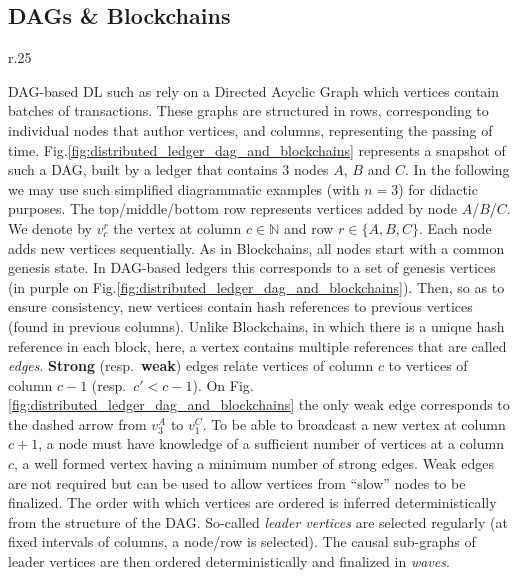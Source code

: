 

\subsection{DAGs \& Blockchains\label{ssec:dags_and_blockchains}}

\begin{wrapfigure}{r}{.25\textwidth}
\vspace*{-.9cm}
    \centering
    \scalebox{.75}{}
    \caption{Simplified example}
    \label{fig:distributed_ledger_dag_and_blockchains}
\vspace*{-.4cm}
\end{wrapfigure}



DAG-based DL such as \cite{all_you_need_is_dag,narwhal_and_tusk,bullshark} rely on a Directed Acyclic Graph which vertices contain batches of transactions.
These graphs are structured in rows, corresponding to individual nodes that author vertices, and columns, representing the passing of time.
Fig.\ref{fig:distributed_ledger_dag_and_blockchains} represents a snapshot of such a DAG, built by a ledger that contains 3 nodes $A$, $B$ and $C$.
In the following we may use such simplified diagrammatic examples (with $n=3$) for didactic purposes.
The top/middle/bottom row represents vertices added by node $A$/$B$/$C$. 
We denote by $v_c^r$ the vertex at column $c \in \mathbb{N}$ and row $r \in \{A,B,C\}$.
Each node adds new vertices sequentially.
As in Blockchains, all nodes start with a common genesis state. 
In DAG-based ledgers this corresponds to a set of genesis vertices (in purple on Fig.\ref{fig:distributed_ledger_dag_and_blockchains}).
Then, so as to ensure consistency, new vertices contain hash references to previous vertices (found in previous columns).
Unlike Blockchains, in which there is a unique hash reference in each block, here, a vertex contains multiple references that are called {\em edges}.
\textbf{Strong} (resp.~\textbf{weak}) edges relate vertices of column $c$ to vertices of column $c-1$ (resp.~$c' < c-1$).
On Fig.\ref{fig:distributed_ledger_dag_and_blockchains} the only weak edge corresponds to the dashed arrow from $v_3^A$ to $v_1^C$.
To be able to broadcast a new vertex at column $c+1$, a node must have knowledge of a sufficient number of vertices at a column $c$, a well formed vertex having a minimum number of strong edges.
Weak edges are not required but can be used to allow vertices from ``slow'' nodes to be finalized.
The order with which vertices are ordered is inferred deterministically from the structure of the DAG.
So-called {\em leader vertices} are selected regularly (at fixed intervals of columns, a node/row is selected).
The causal sub-graphs of leader vertices are then ordered deterministically and finalized in \textit{waves}.





